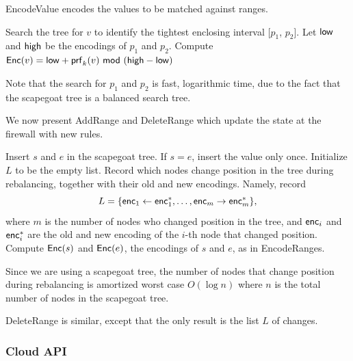 EncodeValue encodes the values to be matched against ranges.

\begin{framed}
\begin{algorithmic}[1]

  \State Search the tree for $v$ to identify the tightest enclosing interval [$p_1$, $p_2$]. 
  \State Let $\mathsf{low}$ and $\mathsf{high}$ be the encodings of $p_1$ and $p_2$. 
  \State Compute $\enc(v) = \low + \prf_k(v)\ \mod\ (\high - \low)$
   \State {}
\EndProcedure

\end{algorithmic}
\end{framed}

Note that the search for $p_1$ and $p_2$ is fast, logarithmic time, due to the fact that the 
scapegoat tree is a balanced search tree. 

We now present AddRange and DeleteRange which update the state at the firewall with new rules. 

\begin{framed}
\begin{algorithmic}[1]

  \State Insert $s$ and $e$ in the scapegoat tree. If $s=e$, insert the value only once.
  \State Initialize $L$ to be the empty list.
  	\State Record which nodes change position in the tree during rebalancing, together with 
	their old and new encodings. Namely, record	\[L = \{ \mathsf{enc}_1 \leftarrow \mathsf{enc}^*_1, \dots, \mathsf{enc}_m \rightarrow \mathsf{enc}^*_m\},\] where $m$ is the number of nodes who changed position in the tree, and $\mathsf{enc}_i$ and $\mathsf{enc}^*_i$ are the old and new encoding of the $i$-th node that changed position. 
  \EndIf
  \State Compute  $\mathsf{Enc}(s)$ and $\mathsf{Enc}(e)$, the encodings of $s$ and $e$, as in EncodeRanges.
   \State {}
\EndProcedure

\end{algorithmic}
\end{framed}


Since we are using a scapegoat tree, the number of nodes that change position during rebalancing is amortized worst case $O(\log n)$ where $n$ is the total number of nodes in the scapegoat tree. 

DeleteRange is similar, except that the only result is the list $L$ of changes. 

\subsubsection{Cloud API}

